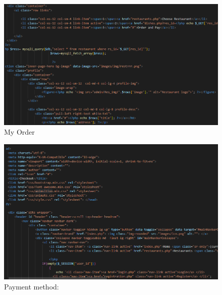 \begin{figure}[h]
    \centering
    \includegraphics[scale=0.55]{c6.png}
    \caption{My Order}
    \label{fig:pereva}
\end{figure}

\begin{figure}[h]
    \centering
    \includegraphics[scale=0.55]{c7.png}
    \caption{Payment method:}
    \label{fig:pereva}
\end{figure}





